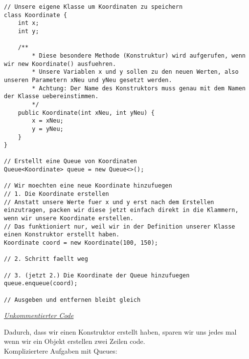 \begin{center}
\begin{lstlisting}
// Unsere eigene Klasse um Koordinaten zu speichern
class Koordinate {
    int x;
    int y;
    
    /** 
        * Diese besondere Methode (Konstruktur) wird aufgerufen, wenn wir new Koordinate() ausfuehren.
        * Unsere Variablen x und y sollen zu den neuen Werten, also unseren Parametern xNeu und yNeu gesetzt werden.
        * Achtung: Der Name des Konstruktors muss genau mit dem Namen der Klasse uebereinstimmen.
        */
    public Koordinate(int xNeu, int yNeu) {
        x = xNeu;
        y = yNeu;
    }
}

// Erstellt eine Queue von Koordinaten
Queue<Koordinate> queue = new Queue<>();

// Wir moechten eine neue Koordinate hinzufuegen
// 1. Die Koordinate erstellen
// Anstatt unsere Werte fuer x und y erst nach dem Erstellen einzutragen, packen wir diese jetzt einfach direkt in die Klammern, wenn wir unsere Koordinate erstellen.
// Das funktioniert nur, weil wir in der Definition unserer Klasse einen Konstruktor erstellt haben.
Koordinate coord = new Koordinate(100, 150);

// 2. Schritt faellt weg

// 3. (jetzt 2.) Die Koordinate der Queue hinzufuegen
queue.enqueue(coord);

// Ausgeben und entfernen bleibt gleich
\end{lstlisting}
\href{https://raw.githubusercontent.com/tim-tm/informatik-notes/main/code/Queue_Beispiel3.java}{\textit{Unkommentierter Code}} \\
\end{center}

\begin{flushleft}
    Dadurch, dass wir einen Konstruktor erstellt haben, sparen wir uns jedes mal wenn wir ein Objekt erstellen zwei Zeilen code. \\
    Kompliziertere Aufgaben mit Queues:
\end{flushleft}

